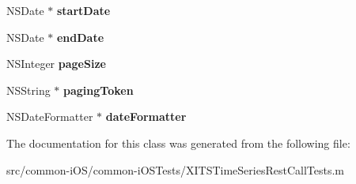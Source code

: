 \begin{DoxyCompactItemize}
\hypertarget{interface_x_i_t_s_time_series_rest_call_tests_a5aed4f10ac4be6896f4f09302006cca2}{}\label{interface_x_i_t_s_time_series_rest_call_tests_a5aed4f10ac4be6896f4f09302006cca2} 
N\+S\+Date $\ast$ {\bfseries start\+Date}
\item 
\hypertarget{interface_x_i_t_s_time_series_rest_call_tests_ac32d7f4fc548e40555972c609a88969f}{}\label{interface_x_i_t_s_time_series_rest_call_tests_ac32d7f4fc548e40555972c609a88969f} 
N\+S\+Date $\ast$ {\bfseries end\+Date}
\item 
\hypertarget{interface_x_i_t_s_time_series_rest_call_tests_a4f153d2efe9b9d8745a446622cf8faf3}{}\label{interface_x_i_t_s_time_series_rest_call_tests_a4f153d2efe9b9d8745a446622cf8faf3} 
N\+S\+Integer {\bfseries page\+Size}
\item 
\hypertarget{interface_x_i_t_s_time_series_rest_call_tests_a3ee26299cb4ec46e99d9da15791cbb66}{}\label{interface_x_i_t_s_time_series_rest_call_tests_a3ee26299cb4ec46e99d9da15791cbb66} 
N\+S\+String $\ast$ {\bfseries paging\+Token}
\item 
\hypertarget{interface_x_i_t_s_time_series_rest_call_tests_a31d2cdeee22b924f9f9c2a9ae198d74d}{}\label{interface_x_i_t_s_time_series_rest_call_tests_a31d2cdeee22b924f9f9c2a9ae198d74d} 
N\+S\+Date\+Formatter $\ast$ {\bfseries date\+Formatter}
\end{DoxyCompactItemize}


The documentation for this class was generated from the following file\+:\begin{DoxyCompactItemize}
\item 
src/common-\/i\+O\+S/common-\/i\+O\+S\+Tests/X\+I\+T\+S\+Time\+Series\+Rest\+Call\+Tests.\+m\end{DoxyCompactItemize}
